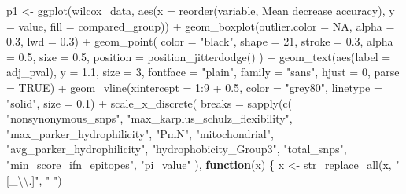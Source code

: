 \documentclass[
  11pt,
  oneside]{book}
\newenvironment{Shaded}{\begin{snugshade}}{\end{snugshade}}
\newcommand{\AttributeTok}[1]{\textcolor[rgb]{0.77,0.63,0.00}{#1}}
\newcommand{\ConstantTok}[1]{\textcolor[rgb]{0.00,0.00,0.00}{#1}}
\newcommand{\ControlFlowTok}[1]{\textcolor[rgb]{0.13,0.29,0.53}{\textbf{#1}}}
\newcommand{\DecValTok}[1]{\textcolor[rgb]{0.00,0.00,0.81}{#1}}
\newcommand{\FloatTok}[1]{\textcolor[rgb]{0.00,0.00,0.81}{#1}}
\newcommand{\FunctionTok}[1]{\textcolor[rgb]{0.00,0.00,0.00}{#1}}
\newcommand{\NormalTok}[1]{#1}
\newcommand{\OtherTok}[1]{\textcolor[rgb]{0.56,0.35,0.01}{#1}}
\newcommand{\SpecialCharTok}[1]{\textcolor[rgb]{0.00,0.00,0.00}{#1}}
\newcommand{\StringTok}[1]{\textcolor[rgb]{0.31,0.60,0.02}{#1}}
\begin{document}
\begin{Shaded}
\begin{Highlighting}[]
\NormalTok{p1 }\OtherTok{\textless{}{-}} \FunctionTok{ggplot}\NormalTok{(wilcox\_data, }\FunctionTok{aes}\NormalTok{(}\AttributeTok{x =} \FunctionTok{reorder}\NormalTok{(variable, }\StringTok{\textasciigrave{}}\AttributeTok{Mean decrease accuracy}\StringTok{\textasciigrave{}}\NormalTok{), }\AttributeTok{y =}\NormalTok{ value, }\AttributeTok{fill =}\NormalTok{ compared\_group)) }\SpecialCharTok{+}
  \FunctionTok{geom\_boxplot}\NormalTok{(}\AttributeTok{outlier.color =} \ConstantTok{NA}\NormalTok{, }\AttributeTok{alpha =} \FloatTok{0.3}\NormalTok{, }\AttributeTok{lwd =} \FloatTok{0.3}\NormalTok{) }\SpecialCharTok{+}
  \FunctionTok{geom\_point}\NormalTok{(}
    \AttributeTok{color =} \StringTok{"black"}\NormalTok{, }\AttributeTok{shape =} \DecValTok{21}\NormalTok{, }\AttributeTok{stroke =} \FloatTok{0.3}\NormalTok{, }\AttributeTok{alpha =} \FloatTok{0.5}\NormalTok{, }\AttributeTok{size =} \FloatTok{0.5}\NormalTok{,}
    \AttributeTok{position =} \FunctionTok{position\_jitterdodge}\NormalTok{()}
\NormalTok{  ) }\SpecialCharTok{+}
  \FunctionTok{geom\_text}\NormalTok{(}\FunctionTok{aes}\NormalTok{(}\AttributeTok{label =}\NormalTok{ adj\_pval), }\AttributeTok{y =} \FloatTok{1.1}\NormalTok{, }\AttributeTok{size =} \DecValTok{3}\NormalTok{, }\AttributeTok{fontface =} \StringTok{"plain"}\NormalTok{, }\AttributeTok{family =} \StringTok{"sans"}\NormalTok{, }\AttributeTok{hjust =} \DecValTok{0}\NormalTok{, }\AttributeTok{parse =} \ConstantTok{TRUE}\NormalTok{) }\SpecialCharTok{+}
  \FunctionTok{geom\_vline}\NormalTok{(}\AttributeTok{xintercept =} \DecValTok{1}\SpecialCharTok{:}\DecValTok{9} \SpecialCharTok{+} \FloatTok{0.5}\NormalTok{, }\AttributeTok{color =} \StringTok{"grey80"}\NormalTok{, }\AttributeTok{linetype =} \StringTok{"solid"}\NormalTok{, }\AttributeTok{size =} \FloatTok{0.1}\NormalTok{) }\SpecialCharTok{+}
  \FunctionTok{scale\_x\_discrete}\NormalTok{(}
    \AttributeTok{breaks =} \FunctionTok{sapply}\NormalTok{(}\FunctionTok{c}\NormalTok{(}
      \StringTok{"nonsynonymous\_snps"}\NormalTok{,}
      \StringTok{"max\_karplus\_schulz\_flexibility"}\NormalTok{,}
      \StringTok{"max\_parker\_hydrophilicity"}\NormalTok{,}
      \StringTok{"PmN"}\NormalTok{,}
      \StringTok{"mitochondrial"}\NormalTok{,}
      \StringTok{"avg\_parker\_hydrophilicity"}\NormalTok{,}
      \StringTok{"hydrophobicity\_Group3"}\NormalTok{,}
      \StringTok{"total\_snps"}\NormalTok{,}
      \StringTok{"min\_score\_ifn\_epitopes"}\NormalTok{,}
      \StringTok{"pi\_value"}
\NormalTok{    ), }\ControlFlowTok{function}\NormalTok{(x) \{}
\NormalTok{      x }\OtherTok{\textless{}{-}} \FunctionTok{str\_replace\_all}\NormalTok{(x, }\StringTok{"[\_}\SpecialCharTok{\textbackslash{}\textbackslash{}}\StringTok{.]"}\NormalTok{, }\StringTok{" "}\NormalTok{)}

\end{Highlighting}
\end{Shaded}
\end{document}
